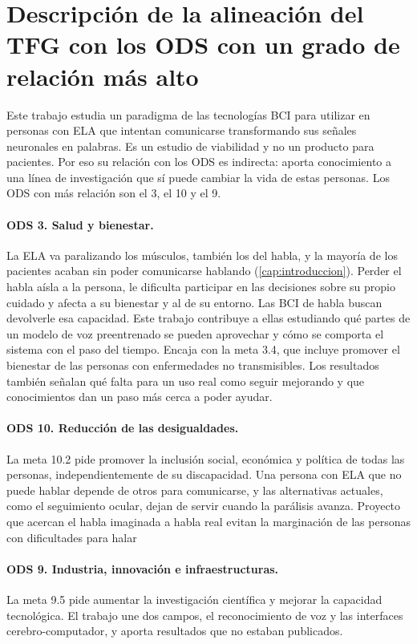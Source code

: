 \section*{Descripción de la alineación del TFG con los ODS con un grado de relación más alto}

Este trabajo estudia un paradigma de las tecnologías BCI para utilizar en personas con ELA que intentan comunicarse transformando sus señales neuronales en palabras. Es un estudio de viabilidad y no un producto para pacientes. Por eso su relación con los ODS es indirecta: aporta conocimiento a una línea de investigación que sí puede cambiar la vida de estas personas. Los ODS con más relación son el 3, el 10 y el 9.

\paragraph{ODS 3. Salud y bienestar.} La ELA va paralizando los músculos, también los del habla, y la mayoría de los pacientes acaban sin poder comunicarse hablando (\cref{cap:introduccion}). Perder el habla aísla a la persona, le dificulta participar en las decisiones sobre su propio cuidado y afecta a su bienestar y al de su entorno. Las BCI de habla buscan devolverle esa capacidad. Este trabajo contribuye a ellas estudiando qué partes de un modelo de voz preentrenado se pueden aprovechar y cómo se comporta el sistema con el paso del tiempo. Encaja con la meta 3.4, que incluye promover el bienestar de las personas con enfermedades no transmisibles. Los resultados también señalan qué falta para un uso real como seguir mejorando y que conocimientos dan un paso más cerca a poder ayudar.

\paragraph{ODS 10. Reducción de las desigualdades.} La meta 10.2 pide promover la inclusión social, económica y política de todas las personas, independientemente de su discapacidad. Una persona con ELA que no puede hablar depende de otros para comunicarse, y las alternativas actuales, como el seguimiento ocular, dejan de servir cuando la parálisis avanza. Proyecto que acercan el habla imaginada a habla real evitan la marginación de las personas con dificultades para halar

\paragraph{ODS 9. Industria, innovación e infraestructuras.} La meta 9.5 pide aumentar la investigación científica y mejorar la capacidad tecnológica. El trabajo une dos campos, el reconocimiento de voz y las interfaces cerebro-computador, y aporta resultados que no estaban publicados.

